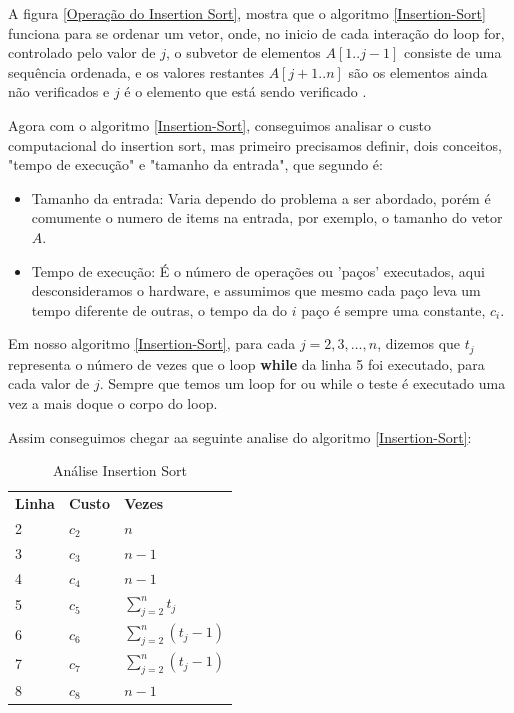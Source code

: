 \documentclass[
	12pt,				%
	openright,			%
	oneside,			%
	a4paper,			%
	english,			%
	brazil				%
	]{abntex2}
\begin{document}
A figura \ref{Operação do Insertion Sort}, mostra que o algoritmo \ref{Insertion-Sort} funciona para se ordenar um vetor,
onde, no inicio de cada interação do loop for, controlado pelo valor de $j$, o subvetor de elementos $A[1..j-1]$ consiste
de uma sequência ordenada, e os valores restantes $A[j+1..n]$ são os elementos ainda não verificados e $j$ é o elemento
que está sendo verificado \cite{introductionAlgorthms}.

Agora com o algoritmo \ref{Insertion-Sort}, conseguimos analisar o custo computacional do insertion sort, mas primeiro
precisamos definir, dois conceitos, "tempo de execução" e "tamanho da entrada", que segundo \cite{introductionAlgorthms} é:

\begin{itemize}
	\item Tamanho da entrada: Varia dependo do problema a ser abordado, porém é comumente o numero de items na entrada,
	por exemplo, o tamanho do vetor $A$.
	\item Tempo de execução: É o número de operações ou 'paços' executados, aqui desconsideramos o hardware, e assumimos
	que mesmo cada paço leva um tempo diferente de outras, o tempo da do $i$ paço é sempre uma constante, $c_i$.  
\end{itemize}

Em nosso algoritmo \ref{Insertion-Sort}, para cada $j = 2, 3, ..., n$, dizemos que $t_j$ representa o número de vezes que
o loop \textbf{while} da linha 5 foi executado, para cada valor de $j$. Sempre que temos um loop for ou while o teste é
executado uma vez a mais doque o corpo do loop.

Assim conseguimos chegar aa seguinte analise do algoritmo \ref{Insertion-Sort}:

\begin{table}[h!]
	\centering
	\caption{\label{Análise-Insertion-Sort} Análise Insertion Sort}
	\begin{tabular}{lll}
		\textbf{Linha} & \textbf{Custo} & \textbf{Vezes} \\
		2 & $c_2$ & $n$ \\
		3 & $c_3$ & $n-1$ \\
		4 & $c_4$ & $n-1$ \\
		5 & $c_5$ & $\sum_{j=2}^{n} t_j$ \\
		6 & $c_6$ & $\sum_{j=2}^{n} (t_j - 1)$ \\
		7 & $c_7$ & $\sum_{j=2}^{n} (t_j - 1)$ \\
		8 & $c_8$ & $n-1$ \\
	\end{tabular}
\end{table}
\end{document}
